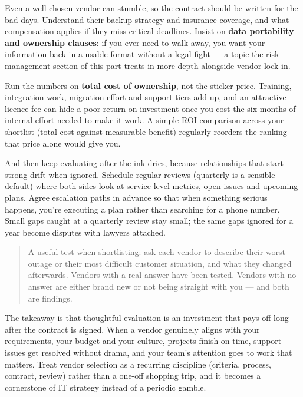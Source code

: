 Even a well-chosen vendor can stumble, so the contract should be written for the bad days. Understand their backup strategy and insurance coverage, and what compensation applies if they miss critical deadlines. Insist on \textbf{data portability and ownership clauses}: if you ever need to walk away, you want your information back in a usable format without a legal fight — a topic the risk-management section of this part treats in more depth alongside vendor lock-in.


Run the numbers on \textbf{total cost of ownership}, not the sticker price. Training, integration work, migration effort and support tiers add up, and an attractive licence fee can hide a poor return on investment once you cost the six months of internal effort needed to make it work. A simple ROI comparison across your shortlist (total cost against measurable benefit) regularly reorders the ranking that price alone would give you.


And then keep evaluating after the ink dries, because relationships that start strong drift when ignored. Schedule regular reviews (quarterly is a sensible default) where both sides look at service-level metrics, open issues and upcoming plans. Agree escalation paths in advance so that when something serious happens, you're executing a plan rather than searching for a phone number. Small gaps caught at a quarterly review stay small; the same gaps ignored for a year become disputes with lawyers attached.



\begin{quote}\small
A useful test when shortlisting: ask each vendor to describe their worst outage or their most difficult customer situation, and what they changed afterwards. Vendors with a real answer have been tested. Vendors with no answer are either brand new or not being straight with you — and both are findings.
\end{quote}


The takeaway is that thoughtful evaluation is an investment that pays off long after the contract is signed. When a vendor genuinely aligns with your requirements, your budget and your culture, projects finish on time, support issues get resolved without drama, and your team's attention goes to work that matters. Treat vendor selection as a recurring discipline (criteria, process, contract, review) rather than a one-off shopping trip, and it becomes a cornerstone of IT strategy instead of a periodic gamble.

